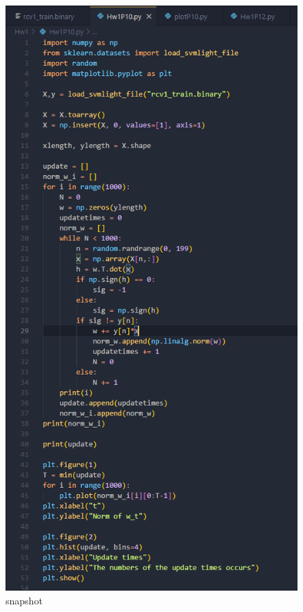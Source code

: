 \documentclass[12pt,a4paper]{article}
\begin{document}
\begin{figure}[hbp]
    \centering
    \begin{minipage}{0.48\linewidth}
        \centering
        \includegraphics[width = \linewidth]{Hw1P11 snapshot.png}
        \caption{snapshot}

\end{minipage}
\end{figure}
\end{document}
